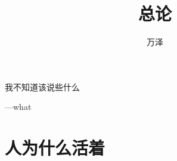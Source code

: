 \documentclass[12pt]{exam}%
\begin{document}
\begin{coverpages}
\title{总论}
\author{万泽}
\maketitle
\tableofcontents
\end{coverpages}
\begin{flushright}
\begin{notecard}[blue!30]{14em}
\ttfamily
我不知道该说些什么

{\hfill\sffamily —what}
\end{notecard}
\end{flushright}
\section{人为什么活着}
\end{document}
